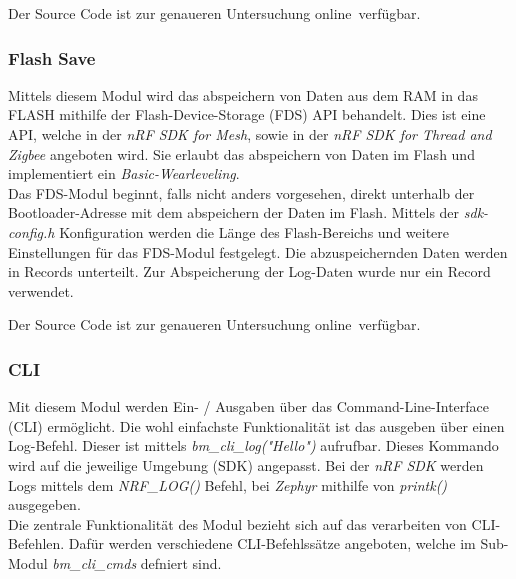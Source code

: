 Der Source Code ist zur genaueren Untersuchung online\footnotemark\ verfügbar. 


\subsubsection{Flash Save}\label{subsubsec:FlashSave}

Mittels diesem Modul wird das abspeichern von Daten aus dem RAM in das FLASH mithilfe der Flash-Device-Storage (FDS) API behandelt. Dies ist eine API, welche in der \textit{nRF SDK for Mesh}, sowie in der \textit{nRF SDK for Thread and Zigbee} angeboten wird. Sie erlaubt das abspeichern von Daten im Flash und implementiert ein \textit{Basic-Wearleveling}. \\

Das FDS-Modul beginnt, falls nicht anders vorgesehen, direkt unterhalb der Bootloader-Adresse mit dem abspeichern der Daten im Flash. Mittels der \textit{sdk-config.h} Konfiguration werden die Länge des Flash-Bereichs und weitere Einstellungen für das FDS-Modul festgelegt. Die abzuspeichernden Daten werden in Records unterteilt. Zur Abspeicherung der Log-Daten wurde nur ein Record verwendet. \cite{nordic_semi_nrf5_sdk_flash_data_storage_2020}

Der Source Code ist zur genaueren Untersuchung online\footnotemark\ verfügbar. 


\subsubsection{CLI}\label{subsubsec:CLI}

Mit diesem Modul werden Ein- / Ausgaben über das Command-Line-Interface (CLI) ermöglicht. Die wohl einfachste Funktionalität ist das ausgeben über einen Log-Befehl. Dieser ist mittels \textit{bm\_cli\_log("Hello")} aufrufbar. Dieses Kommando wird auf die jeweilige Umgebung (SDK) angepasst. Bei der \textit{nRF SDK} werden Logs mittels dem \textit{NRF\_LOG()} Befehl, bei \textit{Zephyr} mithilfe von \textit{printk()} ausgegeben. \\

Die zentrale Funktionalität des Modul bezieht sich auf das verarbeiten von CLI-Befehlen. Dafür werden verschiedene CLI-Befehlssätze angeboten, welche im Sub-Modul \textit{bm\_cli\_cmds} defniert sind. 


